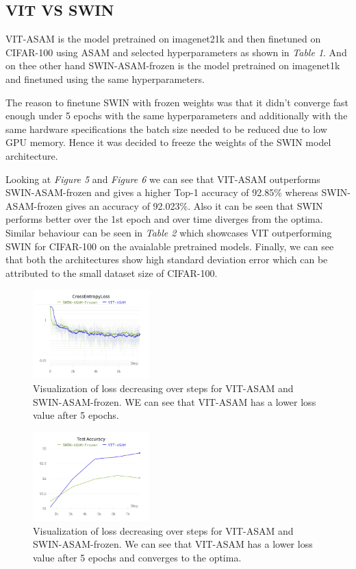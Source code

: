 \documentclass{article}
\begin{document}
\subsection{VIT VS SWIN}
VIT-ASAM is the model pretrained on imagenet21k and then finetuned on CIFAR-100 using ASAM and selected hyperparameters as shown in \textit{Table 1}. 
And on thee other hand SWIN-ASAM-frozen is the model pretrained on imagenet1k and finetuned using the same hyperparameters.

The reason to finetune SWIN with frozen weights was that it didn't converge fast enough under 5 epochs with the same hyperparameters and additionally with the same hardware specifications the batch size needed to be reduced due to low GPU memory. 
Hence it was decided to freeze the weights of the SWIN model architecture.

Looking at \textit{Figure 5} and \textit{Figure 6} we can see that VIT-ASAM outperforms SWIN-ASAM-frozen and gives a higher Top-1 accuracy of 92.85\% whereas SWIN-ASAM-frozen gives an accuracy of 92.023\%. 
Also it can be seen that SWIN performs better over the 1st epoch and over time diverges from the optima. 
Similar behaviour can be seen in \textit{Table 2} which showcases VIT outperforming SWIN for CIFAR-100 on the avaialable pretrained models. 
Finally, we can see that both the architectures show high standard deviation error which can be attributed to the small dataset size of CIFAR-100.

\begin{figure}[ht]
    \vskip 0.2in
    \centering
    \includegraphics[width=0.4\textwidth]{cross_entropy_loss.png}
    \caption{Visualization of loss decreasing over steps for VIT-ASAM and SWIN-ASAM-frozen. WE can see that VIT-ASAM has a lower loss value after 5 epochs.}
    \label{fig:foobar}
    \vskip -0.2in
\end{figure}

\begin{figure}[ht]
    \vskip 0.2in
    \centering
    \includegraphics[width=0.4\textwidth]{test_accuracy.png}
    \caption{Visualization of loss decreasing over steps for VIT-ASAM and SWIN-ASAM-frozen. We can see that VIT-ASAM has a lower loss value after 5 epochs and converges to the optima.}
    \label{fig:foobar}
    \vskip -0.2in
\end{figure}
\end{document}
